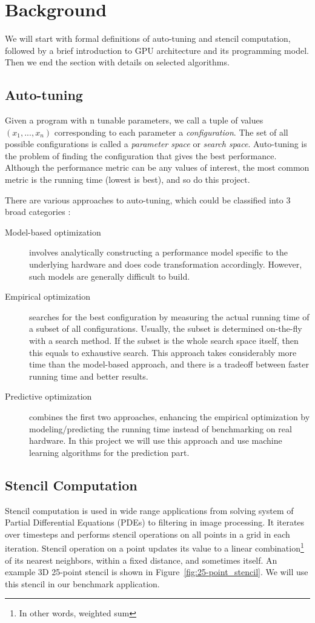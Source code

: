 \section{Background}
We will start with formal definitions of auto-tuning and stencil computation, followed by a brief introduction to GPU architecture and its programming model. Then we end the section with details on selected algorithms.

\subsection{Auto-tuning}
Given a program with n tunable parameters, we call a tuple of values $(x_1, ..., x_n)$ corresponding to each parameter a \emph{configuration}. The set of all possible configurations is called a \emph{parameter space} or \emph{search space}. Auto-tuning  is the problem of finding the configuration that gives the best performance. Although the performance metric can be any values of interest, the most common metric is the running time (lowest is best), and so do this project.

There are various approaches to auto-tuning, which could be classified into 3 broad categories \cite{inpar2012}:
\begin{description}
	\item[Model-based optimization] involves analytically constructing a performance model specific to the underlying hardware and does code transformation accordingly. However, such models are generally difficult to build.
	\item[Empirical optimization] searches for the best configuration by measuring the actual running time of a subset of all configurations. Usually, the subset is determined on-the-fly with a search method. If the subset is the whole search space itself, then this equals to exhaustive search. This approach takes considerably more time than the model-based approach, and there is a tradeoff between faster running time and better results.
	\item[Predictive optimization] combines the first two approaches, enhancing the empirical optimization by modeling/predicting the running time instead of benchmarking on real hardware. In this project we will use this approach and use machine learning algorithms for the prediction part.
\end{description}

\subsection{Stencil Computation}
Stencil computation is used in wide range applications from solving system of Partial Differential Equations (PDEs) to filtering in image processing. It iterates over timesteps and performs stencil operations on all points in a grid in each iteration. Stencil operation on a point updates its value to a linear combination\footnote{In other words, weighted sum} of its nearest neighbors, within a fixed distance, and sometimes itself. An example 3D 25-point stencil is shown in Figure~\ref{fig:25-point_stencil}. We will use this stencil in our benchmark application.

